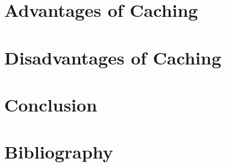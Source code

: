 \documentclass[a4paper,12pt]{article}
\begin{document}
\newpage
\section{Advantages of Caching}\label{advantages}


\newpage
\section{Disadvantages of Caching}\label{disadvantages}


\newpage
\section{Conclusion}\label{conclusion}


\newpage
\renewcommand\refname{\vskip -1cm}
\section{Bibliography}

\nocite{hwu:procon}
\nocite{MPEGDASH}
\nocite{citrix:caching}
\nocite{OnlineVideoBandwagon}
\nocite{ats:caching}
\nocite{expandedramblings:stats}
\nocite{techopedia:weighing}


\end{document}
